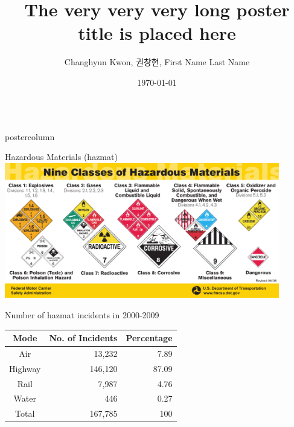 \documentclass[final]{beamer}
\title{The very very very long poster title is placed here}
\author{Changhyun Kwon, 권창현, First Name Last Name}
\institute{KAIST, Department of Industrial and Systems Engineering}
\date{\today}
\newlength{\columnheight}
\begin{document}
\begin{frame}
\begin{columns}








\begin{column}{0.32\textwidth}
\begin{beamercolorbox}[center,wd=\textwidth]{postercolumn}
\begin{minipage}[T]{.95\textwidth}
\parbox[t][\columnheight]{\textwidth}{


	\begin{block}{Hazardous Materials (hazmat)}
  	\includegraphics[width=0.9\textwidth]{yellowcard2}
	\end{block}

  \begin{block}{Number of hazmat incidents in 2000-2009 }
    \begin{table} \centering \small
    \begin{tabular}{|c|r|r|}
    \hline Mode & No. of Incidents & Percentage \\ 
    \hline Air & 13,232 & 7.89 \\ 
    \hline Highway & 146,120 & 87.09 \\ 
    \hline Rail & 7,987 & 4.76 \\ 
    \hline Water & 446 & 0.27 \\ 
    \hline Total & 167,785 & 100 \\ 
    \hline 
    \end{tabular} 
    \end{table}
  \end{block}

}
\end{minipage}
\end{beamercolorbox}
\end{column}
\end{columns}
\end{frame}
\end{document}

